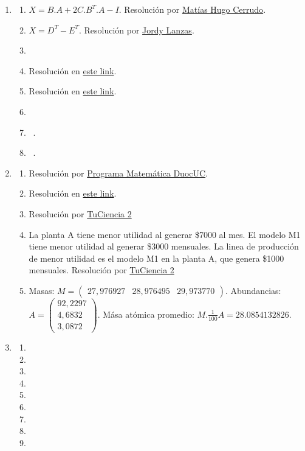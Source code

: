 \documentclass[a4paper]{article}
\newcommand{\exercise}{\item}
\begin{document}
\begin{enumerate}
\begin{enumerate} [label=(\alph*)]
		\item ~
\end{enumerate}\exercise\begin{enumerate} [label=(\alph*)]		\item $X=B.A + 2 C.B^T.A - I$. Resolución por \href{https://youtu.be/U8HIvdPMNCk}{Matías Hugo Cerrudo}.
		\item $X=D^T - E^T$. Resolución por \href{https://youtu.be/6KheMCVO_r0}{Jordy Lanzas}.
		\item ~
		\item Resolución en \href{https://youtu.be/FJoaFy4OIRo}{este link}.
		\item Resolución en \href{https://youtu.be/5AU3jEAnowU?t=334}{este link}.
		\item ~
		\item ~.
		\item ~.
\end{enumerate}\exercise\begin{enumerate} [label=(\alph*)]		\item Resolución por \href{https://youtu.be/G-f-VBTi-4A}{Programa Matemática DuocUC}.
		\item Resolución en \href{https://youtu.be/kvQwypiR71o}{este link}.
		\item Resolución por \href{https://youtu.be/qnA7d-AoodE}{TuCiencia 2}
		\item La planta A tiene menor utilidad al generar \$7000 al mes. El modelo M1 tiene menor utilidad al generar \$3000 mensuales. La linea de producción de menor utilidad es el modelo M1 en la planta A, que genera \$1000 mensuales. Resolución por \href{https://youtu.be/aPGgIhqe96U}{TuCiencia 2}
		\item Masas: $M=\left(\begin{matrix} 27,976927 & 28,976495 & 29,973770 \end{matrix}\right)$. Abundancias: $A=\left(\begin{matrix} 92,2297 \\ 4,6832 \\ 3,0872 \end{matrix}\right)$. Mása atómica promedio: $M.\frac{1}{100}A=28.0854132826$.
\end{enumerate}\exercise\begin{enumerate} [label=(\alph*)]		\item
		\item
		\item
		\item
		\item
		\item
		\item
		\item
		\item
\end{enumerate}\end{enumerate}
\end{document}
